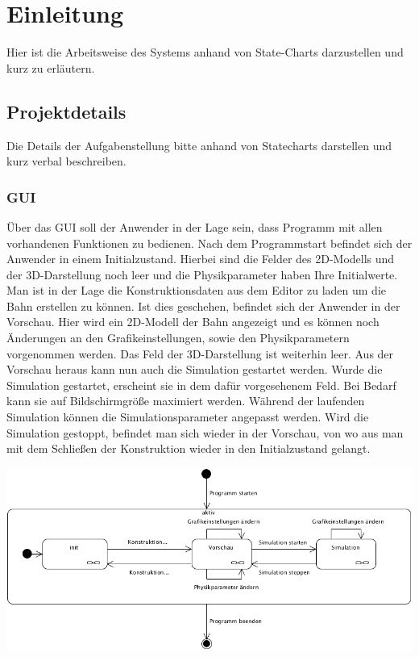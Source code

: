 
\chapter{Einleitung}
Hier ist die Arbeitsweise des Systems anhand von State-Charts darzustellen und
kurz zu erläutern.
\section{Projektdetails}
Die Details der Aufgabenstellung bitte anhand von Statecharts darstellen und
kurz verbal beschreiben.

\subsection{GUI}
Über das GUI soll der Anwender in der Lage sein, dass Programm mit allen vorhandenen Funktionen zu bedienen.
Nach dem Programmstart befindet sich der Anwender in einem Initialzustand. Hierbei sind die Felder des 2D-Modells und der 3D-Darstellung noch leer und die Physikparameter haben Ihre Initialwerte. Man ist in der Lage die Konstruktionsdaten aus dem Editor zu laden um die Bahn erstellen zu können.
Ist dies geschehen, befindet sich der Anwender in der Vorschau. Hier wird ein 2D-Modell der Bahn angezeigt und es können noch Änderungen an den Grafikeinstellungen, sowie den Physikparametern vorgenommen werden. Das Feld der 3D-Darstellung ist weiterhin leer. Aus der Vorschau heraus kann nun auch die Simulation gestartet werden.
Wurde die Simulation gestartet, erscheint sie in dem dafür vorgesehenem Feld. Bei Bedarf kann sie auf Bildschirmgröße maximiert werden. Während der laufenden Simulation können die Simulationsparameter angepasst werden.
Wird die Simulation gestoppt, befindet man sich wieder in der Vorschau, von wo aus man mit dem Schließen der Konstruktion wieder in den Initialzustand gelangt.

\includegraphics[width=16cm]{bilder/StateChart_GUI}

